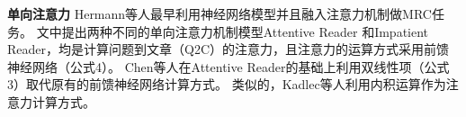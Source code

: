 \noindent\textbf{单向注意力} \quad Hermann等人最早利用神经网络模型并且融入注意力机制做MRC任务。
文中提出两种不同的单向注意力机制模型Attentive Reader
和Impatient Reader，均是计算问题到文章（Q2C）的注意力，且注意力的运算方式采用前馈神经网络（公式4）。
Chen等人在Attentive Reader的基础上利用双线性项（公式3）取代原有的前馈神经网络计算方式。
类似的，Kadlec等人利用内积运算作为注意力计算方式。
\vspace{1ex}

